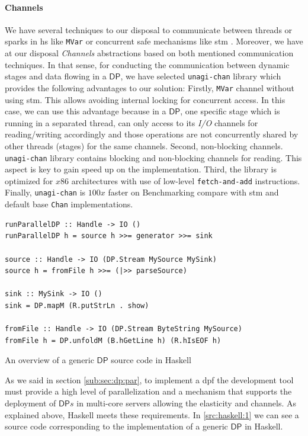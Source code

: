 \documentclass[preprint]{elsarticle}
\newcommand{\DP}{\mathsf{DP}}
\begin{document}
\paragraph{Channels\label{section:channels}} We have several techniques to our disposal to communicate between threads or sparks in \acrshort{hs} like \texttt{MVar} or concurrent safe mechanisms like \acrfull{stm} \cite{stm}. Moreover, we have at our disposal \textit{Channels} abstractions based on both mentioned communication techniques. In that sense, for conducting the communication between dynamic stages and data flowing in a $\DP$, we have selected \texttt{unagi-chan} library \cite{unagi} which provides the following advantages to our solution: Firstly,  \texttt{MVar} channel without using \acrshort{stm}. This allows avoiding internal locking for concurrent access. In this case, we can use this advantage because in a $\DP$, one specific stage which is running in a separated thread, can only access to its \textit{I/O} channels for reading/writing accordingly and those operations are not concurrently shared by other threads (stages) for the same channels. Second,  non-blocking channels. \texttt{unagi-chan} library contains blocking and non-blocking channels for reading. This aspect is key to gain speed up on the implementation. Third, the library is optimized for $x86$ architectures with use of low-level \texttt{fetch-and-add} instructions. Finally, \texttt{unagi-chan} is $100x$ faster on Benchmarking compare with \acrshort{stm} and default base \texttt{Chan} implementations.
%

\begin{listing}[H]
\begin{verbatim}
runParallelDP :: Handle -> IO ()
runParallelDP h = source h >>= generator >>= sink

source :: Handle -> IO (DP.Stream MySource MySink)
source h = fromFile h >>= (|>> parseSource)

sink :: MySink -> IO ()
sink = DP.mapM (R.putStrLn . show)

fromFile :: Handle -> IO (DP.Stream ByteString MySource)
fromFile h = DP.unfoldM (B.hGetLine h) (R.hIsEOF h)

\end{verbatim}
\caption{An overview of a generic $\DP$ source code in Haskell}
\label{src:haskell:1}
\end{listing}
%
As we said in section \ref{sub:sec:dp:par}, to implement a \acrshort{dpf} the development  tool must provide  a high level of  parallelization and a mechanism that supports the deployment of $\DP s$ in multi-core servers allowing the elasticity  and channels. As explained above, Haskell meets these requirements. In  \autoref{src:haskell:1} we can see a source code corresponding to the implementation of a generic $\DP$ in Haskell.
%
\end{document}
